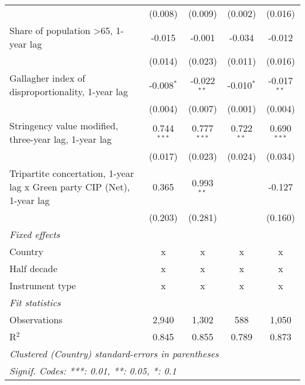 \begin{table}[htbp]
\begin{tabular}{lcccc}
                                                                              & (0.008)       & (0.009)         & (0.002)         & (0.016)\\   
      Share of population >65, 1-year lag                                     & -0.015        & -0.001          & -0.034          & -0.012\\   
                                                                              & (0.014)       & (0.023)         & (0.011)         & (0.016)\\   
      Gallagher index of disproportionality, 1-year lag                       & -0.008$^{*}$  & -0.022$^{**}$   & -0.010$^{*}$    & -0.017$^{**}$\\   
                                                                              & (0.004)       & (0.007)         & (0.001)         & (0.004)\\   
      Stringency value modified, three-year lag, 1-year lag                   & 0.744$^{***}$ & 0.777$^{***}$   & 0.722$^{**}$    & 0.690$^{***}$\\   
                                                                              & (0.017)       & (0.023)         & (0.024)         & (0.034)\\   
      Tripartite concertation, 1-year lag x Green party CIP (Net), 1-year lag & 0.365         & 0.993$^{**}$    &                 & -0.127\\   
                                                                              & (0.203)       & (0.281)         &                 & (0.160)\\   
      \emph{Fixed effects}\\
      Country                                                                 & x             & x               & x               & x\\  
      Half decade                                                             & x             & x               & x               & x\\  
      Instrument type                                                         & x             & x               & x               & x\\  
      \midrule \emph{Fit statistics}\\
      Observations                                                            & 2,940         & 1,302           & 588             & 1,050\\  
      R$^2$                                                                   & 0.845         & 0.855           & 0.789           & 0.873\\  
      \midrule
      \multicolumn{5}{l}{\emph{Clustered (Country) standard-errors in parentheses}}\\
      \multicolumn{5}{l}{\emph{Signif. Codes: ***: 0.01, **: 0.05, *: 0.1}}\\
   \end{tabular}
\end{table}


